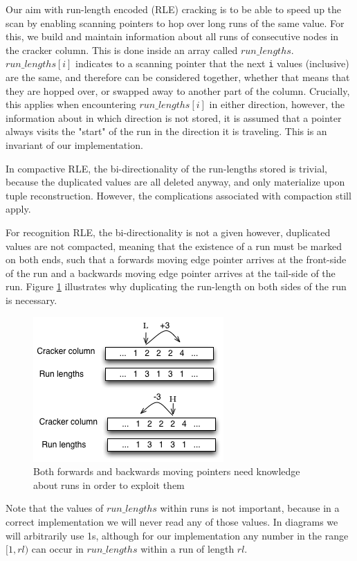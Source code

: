 Our aim with run-length encoded (RLE) cracking is to be able to speed up the scan by enabling scanning pointers to hop over long runs of the same value. For this, we build and maintain information about all runs of consecutive nodes in the cracker column. This is done inside an array called $run\_lengths$. $run\_lengths[i]$ indicates to a scanning pointer that the next \texttt{i} values (inclusive) are the same, and therefore can be considered together, whether that means that they are hopped over, or swapped away to another part of the column. Crucially, this applies when encountering $run\_lengths[i]$ in either direction, however, the information about in which direction is not stored, it is assumed that a pointer always visits the "start" of the run in the direction it is traveling. This is an invariant of our implementation.

In compactive RLE, the bi-directionality of the run-lengths stored is trivial, because the duplicated values are all deleted anyway, and only materialize upon tuple reconstruction. However, the complications associated with compaction still apply.

For recognition RLE, the bi-directionality is not a given however, duplicated values are not compacted, meaning that the existence of a run must be marked on both ends, such that a forwards moving edge pointer arrives at the front-side of the run and a backwards moving edge pointer arrives at the tail-side of the run. Figure \ref{fig:rle_bidirectionality} illustrates why duplicating the run-length on both sides of the run is necessary.

\begin{figure}[H]
  \centering
  \includegraphics[]{images/d9_rle_bidirectionality}
  \caption{Both forwards and backwards moving pointers need knowledge about runs in order to exploit them}
  \label{fig:rle_bidirectionality}
\end{figure}

Note that the values of $run\_lengths$ within runs is not important, because in a correct implementation we will never read any of those values. In diagrams we will arbitrarily use 1s, although for our implementation any number in the range $[1, rl)$ can occur in $run\_lengths$ within a run of length $rl$.

